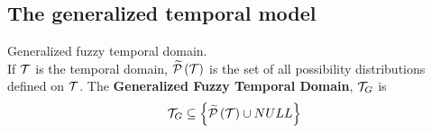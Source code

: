 \subsection{\label{subsec:temporal-model}The generalized temporal model}

\begin{definition}
Generalized fuzzy temporal domain.\\
If $\mathcal{T}$ is the temporal domain, $\widetilde {\mathcal{P}}\left( \mathcal{T}\right)$ is the set of all possibility distributions defined on $\mathcal{T}$.
The \textbf{Generalized Fuzzy Temporal Domain}, $\mathcal{T}_G$ is
\begin{equation}
\mathcal{T}_G \subseteq \left \lbrace \widetilde {\mathcal{P}}\left( \mathcal{T}\right) \cup NULL \right \rbrace
\end{equation}
\end{definition}